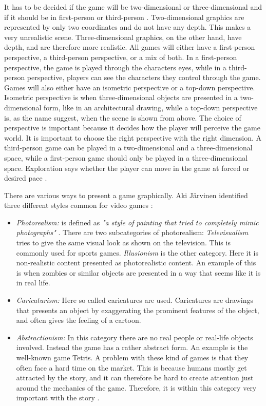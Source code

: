 It has to be decided if the game will be two-dimensional or three-dimensional and if it should be in first-person or third-person \cite{understandingvg}. Two-dimensional graphics are represented by only two coordinates and do not have any depth. This makes a very unrealistic scene. Three-dimensional graphics, on the other hand, have depth, and are therefore more realistic. All games will either have a first-person perspective, a third-person perspective, or a mix of both. In a first-person perspective, the game is played through the characters eyes, while in a third-person perspective, players can see the characters they control through the game. Games will also either have an isometric perspective or a top-down perspective. Isometric perspective is when three-dimensional objects are presented in a two-dimensional form, like in an architectural drawing, while a top-down perspective is, as the name suggest, when the scene is shown from above. The choice of perspective is important because it decides how the player will perceive the game world. It is important to choose the right perspective with the right dimension. A third-person game can be played in a two-dimensional and a three-dimensional space, while a first-person game should only be played in a three-dimensional space. Exploration says whether the player can move in the game at forced or desired pace \cite{understandingvg}.

There are various ways to present a game graphically. Aki Järvinen identified three different styles common for video games \cite{understandingvg}: 

\begin{itemize}
\item \emph{Photorealism:} is defined as \emph{"a style of painting that tried to completely mimic photographs"} \cite{understandingvg}. There are two subcategories of photorealism: \emph{Televisualism} tries to give the same visual look as shown on the television. This is commonly used for sports games. \emph{Illusionism} is the other category. Here it is non-realistic content presented as photorealistic content. An example of this is when zombies or similar objects are presented in a way that seems like it is in real life.  
\item \emph{Caricaturism:} Here so called caricatures are used. Caricatures are drawings that presents an object by exaggerating the prominent features of the object, and often gives the feeling of a cartoon. 
\item \emph{Abstractionism:} In this category there are no real people or real-life objects involved. Instead  the game has a rather abstract form. An example is the well-known game Tetris. A problem with these kind of games is that they often face a hard time on the market. This is because humans mostly get attracted by the story, and it can therefore be hard to create attention just around the mechanics of the game. Therefore, it is within this category very important with the story \cite{understandingvg}. 
\end{itemize}

